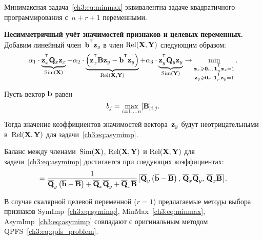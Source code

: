 \documentclass[11pt, a5paper]{dissert}
\begin{document}
\begin{statement}
	Минимаксная задача~\eqref{ch3:eq:minmax} эквивалентна задаче квадратичного программирования с~$n + r + 1$ переменными.
\end{statement}

\textbf{Несимметричный учёт значимостей признаков и целевых переменных.}
Добавим линейный член~$\bb^{\T} \bz_y$ в член $\text{Rel}(\mathbf{X}, \mathbf{Y})$ следующим образом:
\begin{equation}
	\alpha_1 \cdot \underbrace{\bz_x^{\T} \bQ_x \bz_x}_{\text{Sim}(\bX)} - \alpha_2 \cdot  \underbrace{\left(\bz_x^{\T} \bB \bz_y - \bb^{\T} \bz_y \right) }_{\text{Rel}(\bX, \bY)} + \alpha_3 \cdot \underbrace{\bz_y^{\T} \bQ_y \bz_y}_{\text{Sim}(\bY)} \rightarrow \min_{\substack{\bz_x \geq \bZero_n, \, \bOne_n^{\T}\bz_x=1 \\ \bz_y \geq \bZero_r, \, \bOne_r^{\T}\bz_y=1}}.
	\label{ch3:eq:asymimp}
\end{equation}

\begin{statement}
	Пусть вектор $\mathbf{b}$ равен
	\begin{equation*}
	b_j = \max_{i=1, \dots n} [\mathbf{B}]_{i, j}.
	\end{equation*}
	Тогда значение коэффициентов значимостей вектора~$\mathbf{z}_y$ будут неотрицательными в~$\text{Rel}(\mathbf{X}, \mathbf{Y})$ для задачи~\eqref{ch3:eq:asymimp}.
\end{statement}

\begin{statement}
	Баланс между членами~$\text{Sim}(\mathbf{X})$, $\text{Rel}(\mathbf{X}, \mathbf{Y})$ и $\text{Rel}(\mathbf{X}, \mathbf{Y})$ для задачи~\eqref{ch3:eq:asymimp} достигается при следующих коэффициентах:
	\begin{equation*}
		[\alpha_1, \alpha_2, \alpha_3] = \frac{1}{\overline{\bQ}_y \left( \overline{\bb} - \overline{\bB}\right) + \overline{\bQ}_x \overline{\bQ}_y + \overline{\bQ}_x \overline{\bB}} \bigl [\overline{\bQ}_y \left( \overline{\bb} - \overline{\bB}\right), \, \overline{\bQ}_x \overline{\bQ}_y, \, \overline{\bQ}_x \overline{\bB}\bigr].
	\end{equation*}
\end{statement}

\begin{theorem}
	В случае скалярной целевой переменной ($r=1$) предлагаемые методы выбора признаков SymImp~\eqref{ch3:eq:symimp}, MinMax~\eqref{ch3:eq:minmax}, AsymImp~\eqref{ch3:eq:asymimp} совпадают с оригинальным методом QPFS~\eqref{ch3:eq:qpfs_problem}.
\end{theorem}
\end{document}
